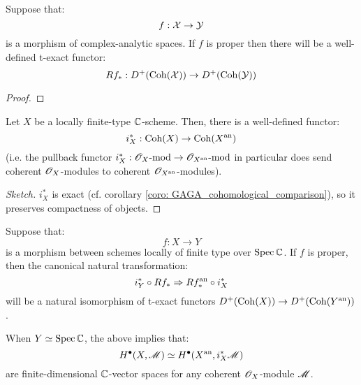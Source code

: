         \begin{lemma} \label{lemma: pushforwards_of_analytic_coherent_modules}
            Suppose that:
                $$f: \mathcal{X} \to \mathcal{Y}$$
            is a morphism of complex-analytic spaces. If $f$ is proper then there will be a well-defined t-exact functor:
                $$Rf_*: D^+(\mathrm{Coh}(\mathcal{X})) \to D^+(\mathrm{Coh}(\mathcal{Y}))$$
        \end{lemma}
            \begin{proof}
                
            \end{proof}
        \begin{lemma} \label{lemma: absolute_analytification_of_coherent_modules}
            Let $X$ be a locally finite-type $\mathbb{C}$-scheme. Then, there is a well-defined functor:
                $$i_X^*: \mathrm{Coh}(X) \to \mathrm{Coh}(X^{\mathrm{an}})$$
            (i.e. the pullback functor $i_X^*: \mathscr{O}_X\text{-}\mathrm{mod} \to \mathscr{O}_{X^{\mathrm{an}}}\text{-}\mathrm{mod}$ in particular does send coherent $\mathscr{O}_X$-modules to coherent $\mathscr{O}_{X^{\mathrm{an}}}$-modules).
        \end{lemma}
            \begin{proof}[Sketch]
                $i_X^*$ is exact (cf. corollary \ref{coro: GAGA_cohomological_comparison}), so it preserves compactness of objects. 
            \end{proof}
        \begin{theorem} \label{theorem: relative_analytification_of_coherent_modules}
            Suppose that:
                $$f: X \to Y$$
            is a morphism between schemes locally of finite type over $\operatorname{Spec} \mathbb{C}$. If $f$ is proper, then the canonical natural transformation:
                $$i_Y^* \circ R f_* \Rightarrow R f^{\mathrm{an}}_* \circ i_X^*$$
            will be a natural isomorphism of t-exact functors $D^+(\mathrm{Coh}(X)) \to D^+(\mathrm{Coh}(Y^{\mathrm{an}}))$.

            When $Y \simeq \operatorname{Spec} \mathbb{C}$, the above implies that:
                $$H^{\bullet}(X, \mathscr{M}) \simeq H^{\bullet}(X^{\mathrm{an}}, i_X^*\mathscr{M})$$
            are finite-dimensional $\mathbb{C}$-vector spaces for any coherent $\mathscr{O}_X$-module $\mathscr{M}$.
        \end{theorem}
